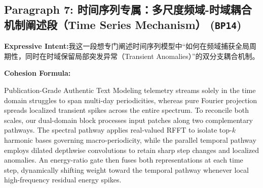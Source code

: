 \subsection*{Paragraph 7: 时间序列专属：多尺度频域-时域耦合机制阐述段（Time Series Mechanism） (\texttt{BP14})}
\noindent\textbf{Expressive Intent:}\enspace 我这一段想专门阐述时间序列模型中“如何在频域捕获全局周期性，同时在时域保留局部突发异常（Transient Anomalies）”的双分支耦合机制。\par
\noindent\textbf{Cohesion Formula:}\par\vspace{4pt}
\begin{ExampleBox}{Publication-Grade Authentic Text}
Modeling telemetry streams solely in the time domain struggles to span multi-day periodicities, whereas pure Fourier projection spreads localized transient spikes across the entire spectrum. To reconcile both scales, our dual-domain block processes input patches along two complementary pathways. The spectral pathway applies real-valued RFFT to isolate top-$k$ harmonic bases governing macro-periodicity, while the parallel temporal pathway employs dilated depthwise convolutions to retain sharp step changes and localized anomalies. An energy-ratio gate then fuses both representations at each time step, dynamically shifting weight toward the temporal pathway whenever local high-frequency residual energy spikes.
\end{ExampleBox}
